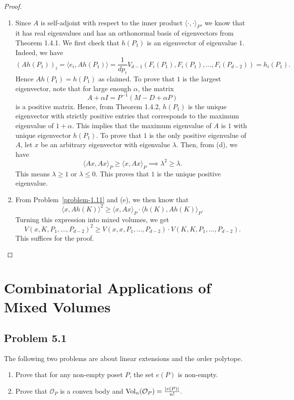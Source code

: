 \documentclass[12pt]{article}
\begin{document}
\begin{proof}
\begin{enumerate}[label = (\alph*)]
		\item Since $A$ is self-adjoint with respect to the inner product $\langle \cdot, \cdot \rangle_P$, we know that it has real eigenvalues and has an orthonormal basis of eigenvectors from Theorem 1.4.1. We first check that $h(P_1)$ is an eigenvector of eigenvalue $1$. Indeed, we have 
		\[
			(Ah(P_1))_i = \langle e_i, Ah(P_1) \rangle = \frac{1}{dp_i} V_{d-1}(F_i(P_1), F_i(P_1), \ldots, F_i(P_{d-2})) = h_i(P_1). 
		\]
		Hence $Ah(P_1) = h(P_1)$ as claimed. To prove that $1$ is the largest eigenvector, note that for large enough $\alpha$, the matrix
		\[
			A + \alpha I = P^{-1}(M - D + \alpha P)
		\]
		is a positive matrix. Hence, from Theorem 1.4.2, $h(P_1)$ is the unique eigenvector with strictly positive entries that corresponds to the maximum eigenvalue of $1 + \alpha$. This implies that the maximum eigenvalue of $A$ is $1$ with unique eigenvector $h(P_1)$. To prove that $1$ is the only positive eigenvalue of $A$, let $x$ be an arbitrary eigenvector with eigenvalue $\lambda$. Then, from (d), we have 
		\[
			\langle Ax, Ax \rangle_P \geq \langle x, Ax \rangle_P \implies \lambda^2 \geq \lambda. 
		\]
		This means $\lambda \geq 1$ or $\lambda \leq 0$. This proves that $1$ is the unique positive eigenvalue. 

		\item From Problem~\ref{problem-1.11} and (e), we then know that 
		\[
			\langle x, Ah(K) \rangle^2 \geq \langle x, Ax \rangle_P \cdot \langle h(K), Ah(K) \rangle_P.
		\]
		Turning this expression into mixed volumes, we get 
		\[
			V(x, K, P_1, \ldots, P_{d-2})^2 \geq V(x, x, P_1, \ldots, P_{d-2}) \cdot V(K, K, P_1, \ldots, P_{d-2}). 
		\]
		This suffices for the proof. 
	\end{enumerate}
\end{proof}

\newpage 

\section{Combinatorial Applications of Mixed Volumes}

\subsection{Problem 5.1}

\begin{problem}
	The following two problems are about linear extensions and the order polytope. 
    \begin{enumerate}[label = (\alph*)]
        \item Prove that for any non-empty poset $P$, the set $e(P)$ is non-empty. 
        \item Prove that $\mathcal{O}_P$ is a convex body and $\operatorname{Vol}_n(\mathcal{O}_P) = \frac{|e(P)|}{n!}$.
    \end{enumerate}
\end{problem}
\end{document}
